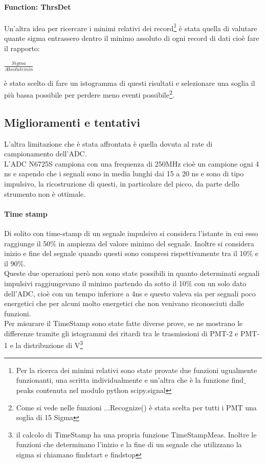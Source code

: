\documentclass[a4paper]{article}
\begin{document}
\paragraph{Function: ThrsDet}
Un'altra idea per ricercare i minimi relativi dei record\footnote{Per la ricerca dei minimi relativi sono state provate due funzioni ugualmente funzionanti, una scritta individualmente e un'altra che è la funzione find$\_$peaks contenuta nel modulo python scipy.signal} è stata quella di valutare quante sigma entrassero dentro il minimo assoluto di ogni record di dati cioè fare il rapporto:

\begin{center}
$\frac{Sigma}{Absolute min}$
\end{center}

è stato scelto di fare un istogramma di questi risultati e selezionare una soglia il più bassa possibile per perdere meno eventi possibile\footnote{Come si vede nelle funzioni ...Recognize() è stata scelta per tutti i PMT una soglia di 15 Sigma}.


\subsection{Miglioramenti e tentativi}
\label{sec:Tentativi}
L'altra limitazione che è stata affrontata è quella dovuta al rate di campionamento dell'ADC.\\
L'ADC N6725S campiona con una frequenza di 250MHz cioè un campione ogni 4 ns e sapendo che i segnali sono in media lunghi dai 15 a 20 ns e sono di tipo impulsivo, la ricostruzione di questi, in particolare del picco, da parte dello strumento non è ottimale.

\paragraph{Time stamp}
Di solito con time-stamp di un segnale impulsivo si considera l'istante in cui esso raggiunge il 50$\%$ in ampiezza del valore minimo del segnale. Inoltre si considera inizio e fine del segnale quando questi sono compresi rispettivamente tra il 10$\%$ e il 90$\%$.\\
Queste due operazioni però non sono state possibili in quanto determinati segnali impulsivi raggiungevano il minimo partendo da sotto il 10$\%$ con un solo dato dell'ADC, cioè con un tempo inferiore a 4ns e questo valeva sia per segnali poco energetici che per alcuni molto energetici che non venivano riconosciuti dalle funzioni.\\
Per misurare il TimeStamp sono state fatte diverse prove, se ne mostrano le differenze tramite gli istogrammi dei ritardi tra le trasmissioni di PMT-2 e PMT-1 e la distribuzione di V\footnote{il calcolo di TimeStamp ha una propria funzione TimeStampMeas. Inoltre le funzioni che determinano l'inizio e la fine di un segnale che utilizzano la sigma si chiamano findstart e findstop}
\end{document}
